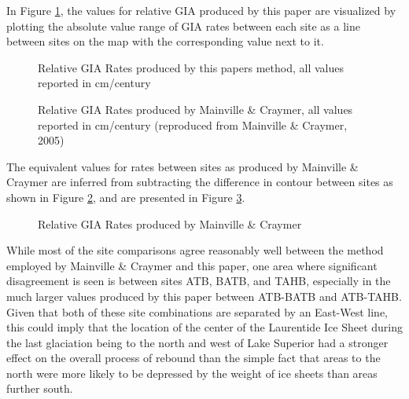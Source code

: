 
In Figure \ref{fig:myGIARates}, the values for relative GIA produced by this paper are
visualized by plotting the absolute value range of GIA rates between each site
as a line between sites on the map with the corresponding value next to it.

\begin{figure}[h]
	\caption{Relative GIA Rates produced by this papers method, all values reported in cm/century}
	\label{fig:myGIARates}
\end{figure}
\newpage
\begin{figure}[h]
	\caption{Relative GIA Rates produced by Mainville \& Craymer, all values reported in cm/century (reproduced from Mainville \& Craymer, 2005)}
	\label{fig:craymerGIARatesBigPlot}
\end{figure}

The equivalent values for rates between sites as produced by Mainville \& Craymer
are inferred from subtracting the difference in contour between sites as shown in
Figure \ref{fig:craymerGIARatesBigPlot}, and are presented in Figure \ref{fig:craymerGIARates}.

\begin{figure}[h]
	\caption{Relative GIA Rates produced by Mainville \& Craymer}
	\label{fig:craymerGIARates}
\end{figure}
\newpage

While most of the site comparisons agree reasonably well between the method
employed by Mainville \& Craymer and this paper, one area where significant
disagreement is seen is between sites ATB, BATB, and TAHB, especially in the much
larger values produced by this paper between ATB-BATB and ATB-TAHB. Given that both
of these site combinations are separated by an East-West line, this could imply
that the location of the center of the Laurentide Ice Sheet during the last glaciation being to the
north and west of Lake Superior had a stronger effect on the overall process of
rebound than the simple fact that areas to the north were more likely to be
depressed by the weight of ice sheets than areas further south.
